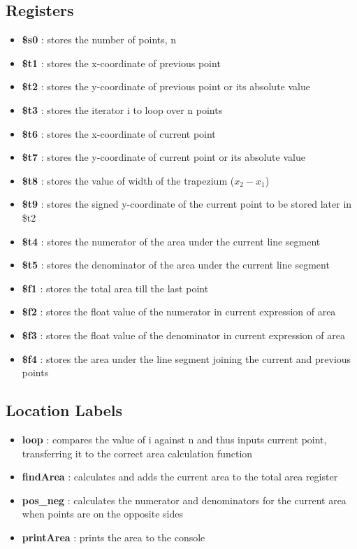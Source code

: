 \documentclass{article} %
\begin{document}
\subsection{Registers}
\begin{itemize}
    \item \textbf{\$s0} : stores the number of points, n
    \item \textbf{\$t1} : stores the x-coordinate of previous point
    \item \textbf{\$t2} : stores the y-coordinate of previous point or its absolute value
    \item \textbf{\$t3} : stores the iterator i to loop over n points
    \item \textbf{\$t6} : stores the x-coordinate of current point
    \item \textbf{\$t7} : stores the y-coordinate of current point or its absolute value
    \item \textbf{\$t8} : stores the value of width of the trapezium ($x_2 - x_1$)
    \item \textbf{\$t9} : stores the signed y-coordinate of the current point to be stored later in \$t2
    \item \textbf{\$t4} : stores the numerator of the area under the current line segment
    \item \textbf{\$t5} : stores the denominator of the area under the current line segment
    \item \textbf{\$f1} : stores the total area till the last point
    \item \textbf{\$f2} : stores the float value of the numerator in current expression of area
    \item \textbf{\$f3} : stores the float value of the denominator in current expression of area
    \item \textbf{\$f4} : stores the area under the line segment joining the current and previous points
\end{itemize}
\subsection{Location Labels}
\begin{itemize}
    \item \textbf{loop} : compares the value of i against n and thus inputs current point, transferring it to the correct area calculation function
    \item \textbf{findArea} : calculates and adds the current area to the total area register
    \item \textbf{pos\_neg} : calculates the numerator and denominators for the current area when points are on the opposite sides
    \item \textbf{printArea} : prints the area to the console
\end{itemize}
\end{document}
